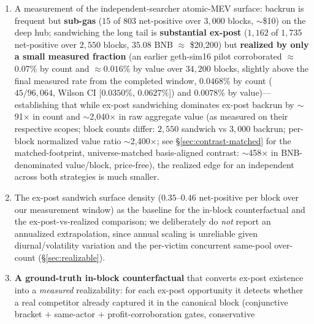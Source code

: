 \documentclass[11pt]{article}
\begin{document}
\begin{enumerate}
    this scope difference is intentional (long-tail sandwiching is where ex-post value
    concentrates) but means the resulting gap reflects both strategy profitability
    \emph{and} the portfolio difference.
    Prior executing tools (e.g.\ Lanturn \cite{babel2023lanturn}) EVM-evaluate
    constructed strategies but optimize one target at a time; we instead hold a single
    per-block victim stream fixed and price \emph{both} atomic categories on it.
  \item A measurement of the independent-searcher atomic-MEV surface: backrun is
    frequent but \textbf{sub-gas} ($15$ of $803$ net-positive over $3{,}000$ blocks,
    $\sim$\$10) on the deep hub; sandwiching the long tail is \textbf{substantial
    ex-post} ($1{,}162$ of $1{,}735$ net-positive over $2{,}550$ blocks, $35.08$ BNB
    $\approx$ \$20{,}200) but \textbf{realized by only a small measured fraction}
    (an earlier geth-sim16 pilot corroborated $\approx$$0.07\%$ by count and
    $\approx$$0.016\%$ by value over $34{,}200$ blocks, slightly above the final measured rate from
    the completed window, $0.0468\%$ by count ($45/96{,}064$, Wilson CI [$0.0350\%$, $0.0627\%$]) and $0.0078\%$ by value)---establishing
    that while ex-post sandwiching dominates ex-post backrun by $\sim$91$\times$ in
    count and $\sim$2{,}040$\times$ in raw aggregate value (as measured on their
    respective scopes; block counts differ: $2{,}550$ sandwich vs $3{,}000$ backrun;
    per-block normalized value ratio $\sim$2{,}400$\times$; see
    \S\ref{sec:contrast-matched} for the matched-footprint, universe-matched
    basis-aligned contrast: $\sim$458$\times$ in BNB-denominated value/block, price-free),
    the realized edge for an independent across both strategies is
    much smaller.
  \item The ex-post sandwich surface density ($0.35$--$0.46$ net-positive per block over
    our measurement window) as the baseline for the in-block counterfactual and the
    ex-post-vs-realized comparison; we deliberately do \emph{not} report an annualized
    extrapolation, since annual scaling is unreliable given diurnal/volatility variation
    and the per-victim concurrent same-pool over-count (\S\ref{sec:realizable}).
  \item \textbf{A ground-truth in-block counterfactual} that converts ex-post
    existence into a \emph{measured} realizability: for each ex-post opportunity it
    detects whether a real competitor already captured it in the canonical block
    (conjunctive bracket $+$ same-actor $+$ profit-corroboration gates, conservative

\end{enumerate}
\end{document}
